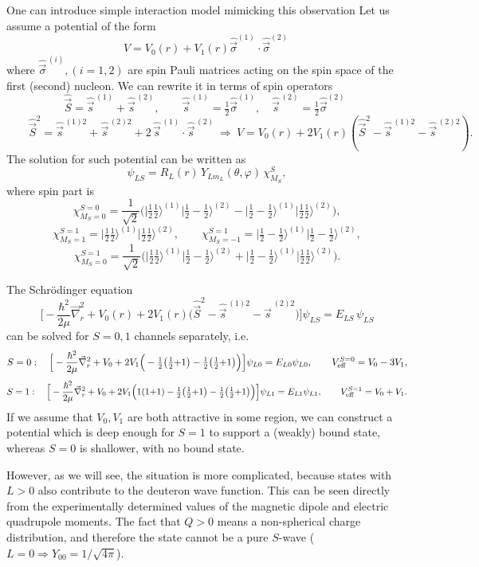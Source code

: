\documentclass[11pt,a4paper]{article}
\newcommand{\op}[1]{\hat{#1}}
\begin{document}
One can introduce simple interaction model mimicking this observation
Let us assume a potential of the form 
\[
V=V_0(r)+V_1(r) \op {\vec \sigma}^{(1)} \cdot \op {\vec \sigma}^{(2)}\
\]
where $\op {\vec \sigma}^{\,(i)}, (i=1,2) $ are spin Pauli matrices acting on the spin space of the first (second) nucleon. 
We can rewrite it in terms of spin operators
\[
\op {\vec S}=\op {\vec s}^{\,(1)}+\op {\vec s}^{\,(2)},
\qquad
\op {\vec s}^{\,(1)}=\tfrac12\op{\vec\sigma}^{(1)},\quad \op {\vec s}^{\,(2)}=\tfrac12\op{\vec\sigma}^{(2)}
\ \ 
\]
\[
\qquad
\op {\vec S}^2=\op {\vec s}^{\,(1)2}+\op {\vec s}^{\,(2)2}+2\,\op {\vec s}^{\,(1)}\!\cdot \op {\vec s}^{\,(2)}
\ \Rightarrow\
V=V_0(r)+2 V_1(r) ( \op {\vec S}^2- \op {\vec s} ^{\,(1)2}-\op {\vec s}^{\,(2)2}).
\]
The solution for such potential can be written as 
\[
\psi_{LS}=R_L(r)\,Y_{Lm_L}(\theta,\varphi)\,\chi^S_{M_S},
\]
where spin part is
\[
\chi^{S=0}_{M_S=0}=\frac{1}{\sqrt2}\Big(\big|\tfrac12\tfrac12\big\rangle^{(1)}\big|\tfrac12{-}\tfrac12\big\rangle^{(2)}
-\big|\tfrac12{-}\tfrac12\big\rangle^{(1)}\big|\tfrac12\tfrac12\big\rangle^{(2)}\Big),
\]
\[
\chi^{S=1}_{M_S=1}=\big|\tfrac12\tfrac12\big\rangle^{(1)}\big|\tfrac12\tfrac12\big\rangle^{(2)},\qquad
\chi^{S=1}_{M_S=-1}=\big|\tfrac12{-}\tfrac12\big\rangle^{(1)}\big|\tfrac12{-}\tfrac12\big\rangle^{(2)},
\]
\[
\chi^{S=1}_{M_S=0}=\frac{1}{\sqrt2}\Big(\big|\tfrac12\tfrac12\big\rangle^{(1)}\big|\tfrac12{-}\tfrac12\big\rangle^{(2)}
+\big|\tfrac12{-}\tfrac12\big\rangle^{(1)}\big|\tfrac12\tfrac12\big\rangle^{(2)}\Big).
\]

The Schr\"odinger equation
\[
\Big[-\frac{\hbar^2}{2\mu}\vec\nabla_r^2+V_0(r)+2V_1(r)\big( \op {\vec S}^2- \op {\vec s} ^{\,(1)2}- \op {\vec s}^{\,(2)2}\big)\Big]\psi_{LS}
=E_{LS}\,\psi_{LS}
\]
can be solved for $S=0,1$ channels separately, i.e. 
\[
S=0:\quad
\Big[-\frac{\hbar^2}{2\mu}\vec\nabla_r^2+V_0+2 V_1 \Big(-\tfrac12\big(\tfrac12{+}1\big)-\tfrac12\big(\tfrac12{+}1\big)\Big)\Big]\psi_{L0}=E_{L0}\psi_{L0},
\qquad
V_{\rm eff}^{S=0}=V_0-3V_1,
\]
\[
S=1:\quad
\Big[-\frac{\hbar^2}{2\mu}\vec\nabla_r^2+V_0+2 V_1\Big(1(1{+}1)-\tfrac12\big(\tfrac12{+}1\big)-\tfrac12\big(\tfrac12{+}1\big)\Big)\Big]\psi_{L1}=E_{L1}\psi_{L1},
\qquad
V_{\rm eff}^{S=1}=V_0+V_1 .
\]
If we assume that $V_0,V_1$ are both attractive in some region,  we can construct a potential which is deep enough for $S=1$ to support a (weakly) bound state, whereas $S=0$ is shallower, with no bound state.

However, as we will see, the situation is more complicated, because states with $L>0$ also contribute to the deuteron wave function. This can be seen directly from the experimentally determined values of the magnetic dipole and electric quadrupole moments. The fact that $Q>0$ means a non-spherical charge distribution, and therefore the state cannot be a pure $S$-wave ($L=0\Rightarrow Y_{00}=1/\sqrt{4\pi}$).
\end{document}
